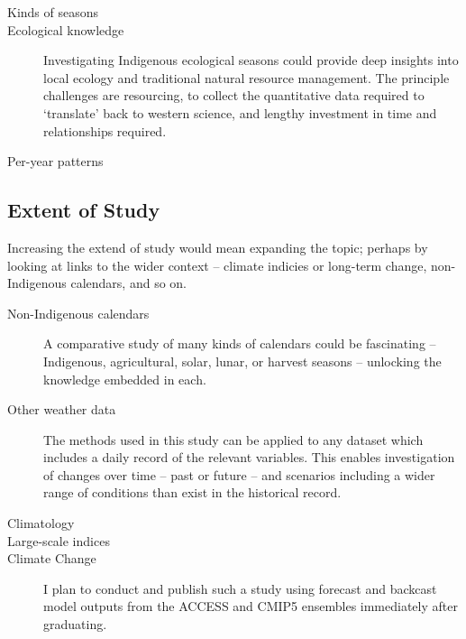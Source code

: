 \begin{description}
\item[Kinds of seasons]

\item[Ecological knowledge]
    Investigating Indigenous ecological seasons could provide deep insights
    into local ecology and traditional natural resource management.
    The principle challenges are resourcing, to collect the quantitative
    data required to `translate' back to western science, and lengthy
    investment in time and relationships required.

\item[Per-year patterns]

\item[]

\end{description}



\subsection{Extent of Study}
Increasing the extend of study would mean expanding the topic; perhaps by
looking at links to the wider context -- climate indicies or long-term
change, non-Indigenous calendars, and so on.

\begin{description}
\item[Non-Indigenous calendars]
    A comparative study of many kinds of calendars could be fascinating --
    Indigenous, agricultural, solar, lunar, or harvest seasons -- unlocking
    the knowledge embedded in each.

\item[Other weather data]
    The methods used in this study can be applied to any dataset which
    includes a daily record of the relevant variables.  This enables
    investigation of changes over time -- past or future -- and scenarios
    including a wider range of conditions than exist in the historical record.

\item[Climatology]

\item[Large-scale indices]

\item[Climate Change]
    I plan to conduct and publish such a study using forecast and backcast
    model outputs from the ACCESS and CMIP5 ensembles immediately
    after graduating.

\end{description}

